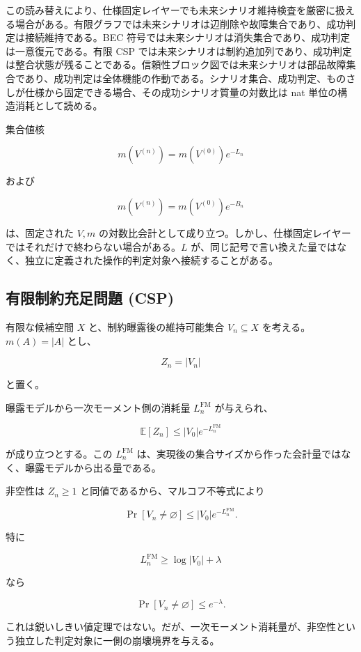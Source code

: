 \documentclass[12pt,a4paper]{article}
\begin{document}
この読み替えにより、仕様固定レイヤーでも未来シナリオ維持検査を厳密に扱える場合がある。有限グラフでは未来シナリオは辺削除や故障集合であり、成功判定は接続維持である。BEC 符号では未来シナリオは消失集合であり、成功判定は一意復元である。有限 CSP では未来シナリオは制約追加列であり、成功判定は整合状態が残ることである。信頼性ブロック図では未来シナリオは部品故障集合であり、成功判定は全体機能の作動である。シナリオ集合、成功判定、ものさしが仕様から固定できる場合、その成功シナリオ質量の対数比は nat 単位の構造消耗として読める。

集合値核

\[
m(V^{(n)})=m(V^{(0)})e^{-L_{n}}
\]

および

\[
m(V^{(n)})=m(V^{(0)})e^{-B_{n}}
\]

は、固定された \(V,m\) の対数比会計として成り立つ。しかし、仕様固定レイヤーではそれだけで終わらない場合がある。\(L\) が、同じ記号で言い換えた量ではなく、独立に定義された操作的判定対象へ接続することがある。

\subsection{有限制約充足問題 (CSP)}\label{ux6709ux9650ux5236ux7d04ux5145ux8db3ux554fux984c-csp}

有限な候補空間 \(X\) と、制約曝露後の維持可能集合 \(V_{n}\subseteq X\) を考える。\(m(A)=|A|\) とし、

\[
Z_{n}=|V_{n}|
\]

と置く。

曝露モデルから一次モーメント側の消耗量 \(L_{n}^{\mathrm{FM}}\) が与えられ、

\[
\mathbb E[Z_{n}]\le |V_0|e^{-L_{n}^{\mathrm{FM}}}
\]

が成り立つとする。この \(L_{n}^{\mathrm{FM}}\) は、実現後の集合サイズから作った会計量ではなく、曝露モデルから出る量である。

非空性は \(Z_{n}\ge1\) と同値であるから、マルコフ不等式により

\[
\Pr[V_{n}\ne\varnothing]\le |V_0|e^{-L_{n}^{\mathrm{FM}}}.
\]

特に

\[
L_{n}^{\mathrm{FM}}\ge \log |V_0|+\lambda
\]

なら

\[
\Pr[V_{n}\ne\varnothing]\le e^{-\lambda}.
\]

これは鋭いしきい値定理ではない。だが、一次モーメント消耗量が、非空性という独立した判定対象に一側の崩壊境界を与える。
\end{document}
